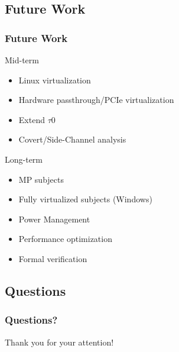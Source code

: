 \documentclass[xcolor={dvipsnames}]{beamer}
\begin{document}
\subsection{Future Work}
\begin{frame}\frametitle{Future Work}
\begin{block}{Mid-term}
	\begin{itemize}
		\item Linux virtualization
		\item Hardware passthrough/PCIe virtualization
		\item Extend $\tau$0
		\item Covert/Side-Channel analysis
	\end{itemize}
\end{block}
\begin{block}{Long-term}
	\begin{itemize}
		\item MP subjects
		\item Fully virtualized subjects (Windows)
		\item Power Management
		\item Performance optimization
		\item Formal verification
	\end{itemize}
\end{block}
\end{frame}

\subsection{Questions}
\begin{frame}\frametitle{Questions?}
\begin{center}
	Thank you for your attention!
\end{center}
\end{frame}
\end{document}
